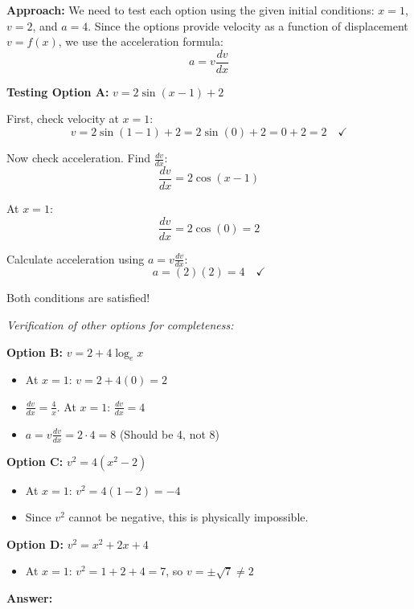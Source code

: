 \begin{solution}
\textbf{Approach:} We need to test each option using the given initial conditions: $x = 1$, $v = 2$, and $a = 4$. Since the options provide velocity as a function of displacement $v = f(x)$, we use the acceleration formula:
\[
a = v\frac{dv}{dx}
\]

\textbf{Testing Option A:} $v = 2\sin(x-1) + 2$

First, check velocity at $x=1$:
\[ v = 2\sin(1-1) + 2 = 2\sin(0) + 2 = 0 + 2 = 2 \quad \checkmark \]

Now check acceleration. Find $\frac{dv}{dx}$:
\[ \frac{dv}{dx} = 2\cos(x-1) \]

At $x=1$:
\[ \frac{dv}{dx} = 2\cos(0) = 2 \]

Calculate acceleration using $a = v\frac{dv}{dx}$:
\[ a = (2)(2) = 4 \quad \checkmark \]

Both conditions are satisfied!

\vspace{0.5cm}

\textit{Verification of other options for completeness:}

\textbf{Option B:} $v = 2 + 4\log_e x$
\begin{itemize}
    \item At $x=1$: $v = 2 + 4(0) = 2$ \quad \checkmark
    \item $\frac{dv}{dx} = \frac{4}{x}$. At $x=1$: $\frac{dv}{dx} = 4$
    \item $a = v\frac{dv}{dx} = 2 \cdot 4 = 8$ \quad \texttimes \quad (Should be 4, not 8)
\end{itemize}

\textbf{Option C:} $v^2 = 4(x^2 - 2)$
\begin{itemize}
    \item At $x=1$: $v^2 = 4(1 - 2) = -4$
    \item Since $v^2$ cannot be negative, this is physically impossible. \quad \texttimes
\end{itemize}

\textbf{Option D:} $v^2 = x^2 + 2x + 4$
\begin{itemize}
    \item At $x=1$: $v^2 = 1 + 2 + 4 = 7$, so $v = \pm\sqrt{7} \neq 2$ \quad \texttimes
\end{itemize}

\textbf{Answer:} 
\end{solution}

